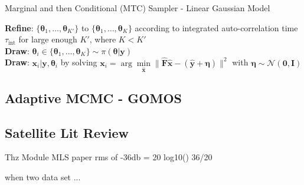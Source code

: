 \begin{algorithm}[!thb]
    \caption{Marginal and then Conditional (MTC) Sampler - Linear Gaussian Model}
    \label{alg:MTC}
    \SetAlgoLined
    \textbf{Refine}: $\{ \bm{\theta}_{1}, \dots ,\bm{\theta}_{K'}\}$ to $\{ \bm{\theta}_{1}, \dots ,\bm{\theta}_{K}\}$  according to integrated auto-correlation time $\tau_{\text{int}}$ for large enough $K'$, where $K< K'$\\
    \textbf{Draw}: $\bm{\theta}_{i} \in \{ \bm{\theta}_{1}, \dots ,\bm{\theta}_{K}\} \sim \pi(\bm{\theta}| \bm{y})$ \\
    \textbf{Draw}: $\bm{x}_i | \bm{y}, \bm{\theta}_{i}$ by solving $  \bm{x}_i = \arg \underset{\hat{\bm{x}}}{\min} \lVert \hat{\bm{F}} \hat{\bm{x}} - ( \hat{\bm{y}} + \bm{\eta} ) \rVert^2$ with $\bm{\eta} \sim \mathcal{N}(\bm{0}, \mathbf{I})$
\end{algorithm}



\subsection{Adaptive MCMC - GOMOS}
\label{subsec:GOMOS}


\subsection{Satellite Lit Review}


Thz Module MLS paper
rms of -36db = 20 log10()
36/20



when two data set ...


